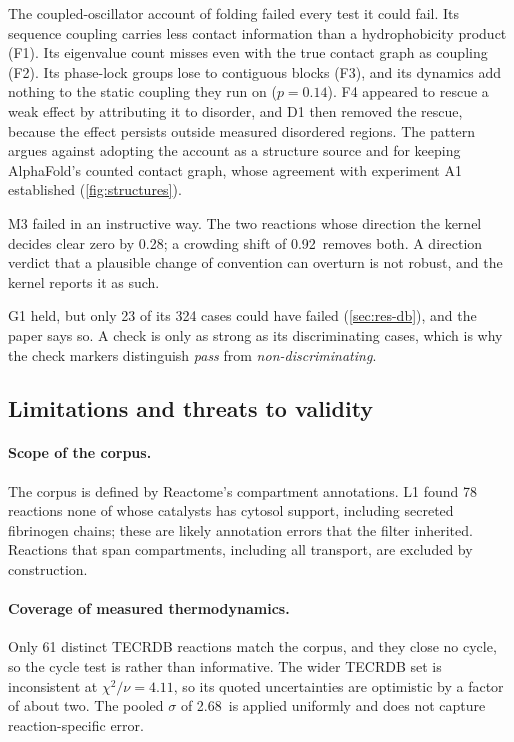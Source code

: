 The coupled-oscillator account of folding failed every test it could fail.
Its sequence coupling carries less contact information than a hydrophobicity product (F1).
Its eigenvalue count misses even with the true contact graph as coupling (F2).
Its phase-lock groups lose to contiguous blocks (F3), and its dynamics add nothing to the static coupling they run on ($p=0.14$).
F4 appeared to rescue a weak effect by attributing it to disorder, and D1 then removed the rescue, because the effect persists outside measured disordered regions.
The pattern argues against adopting the account as a structure source and for keeping AlphaFold's counted contact graph, whose agreement with experiment A1 established (\cref{fig:structures}).

M3 failed in an instructive way.
The two reactions whose direction the kernel decides clear zero by 0.28\kJ; a crowding shift of 0.92\kJ\ removes both.
A direction verdict that a plausible change of convention can overturn is not robust, and the kernel reports it as such.

G1 held, but only 23 of its 324 cases could have failed (\cref{sec:res-db}), and the paper says so.
A check is only as strong as its discriminating cases, which is why the check markers distinguish \emph{pass} from \emph{non-discriminating}.

\subsection{Limitations and threats to validity}
\label{sec:limitations}

\paragraph{Scope of the corpus.}
The corpus is defined by Reactome's compartment annotations.
L1 found 78 reactions none of whose catalysts has cytosol support, including secreted fibrinogen chains; these are likely annotation errors that the filter inherited.
Reactions that span compartments, including all transport, are excluded by construction.

\paragraph{Coverage of measured thermodynamics.}
Only 61 distinct TECRDB reactions match the corpus, and they close no cycle, so the cycle test is  rather than informative.
The wider TECRDB set is inconsistent at $\chi^2/\nu=4.11$, so its quoted uncertainties are optimistic by a factor of about two.
The pooled $\sigma$ of 2.68\kJ\ is applied uniformly and does not capture reaction-specific error.

